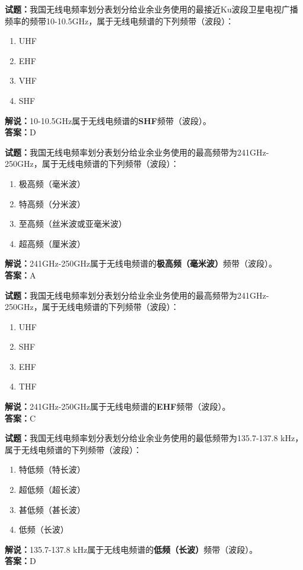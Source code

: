 \documentclass{ctexbook}
\begin{document}

\bigskip


\noindent\textbf{试题：}我国无线电频率划分表划分给业余业务使用的最接近Ku波段卫星电视广播频率的频带10-10.5GHz，属于无线电频谱的下列频带（波段）：
\begin{enumerate}[leftmargin=3em]
\item UHF
\item EHF
\item VHF
\item SHF
\end{enumerate}
\noindent\textbf{解说：}10-10.5GHz属于无线电频谱的\textbf{SHF}频带（波段）。\\\noindent\textbf{答案：}D


\bigskip


\noindent\textbf{试题：}我国无线电频率划分表划分给业余业务使用的最高频带为241GHz-250GHz，属于无线电频谱的下列频带（波段）：
\begin{enumerate}[leftmargin=3em]
\item 极高频（毫米波）
\item 特高频（分米波）
\item 至高频（丝米波或亚毫米波）
\item 超高频（厘米波）
\end{enumerate}
\noindent\textbf{解说：}241GHz-250GHz属于无线电频谱的\textbf{极高频（毫米波）}频带（波段）。\\\noindent\textbf{答案：}A




\bigskip


\noindent\textbf{试题：}我国无线电频率划分表划分给业余业务使用的最高频带为241GHz-250GHz，属于无线电频谱的下列频带（波段）：
\begin{enumerate}[leftmargin=3em]
\item UHF
\item SHF
\item EHF
\item THF
\end{enumerate}
\noindent\textbf{解说：}241GHz-250GHz属于无线电频谱的\textbf{EHF}频带（波段）。\\\noindent\textbf{答案：}C




\bigskip


\noindent\textbf{试题：}我国无线电频率划分表划分给业余业务使用的最低频带为135.7-137.8 kHz，属于无线电频谱的下列频带（波段）：
\begin{enumerate}[leftmargin=3em]
\item 特低频（特长波）
\item 超低频（超长波）
\item 甚低频（甚长波）
\item 低频（长波）
\end{enumerate}
\noindent\textbf{解说：}135.7-137.8 kHz属于无线电频谱的\textbf{低频（长波）}频带（波段）。\\\noindent\textbf{答案：}D
\end{document}
